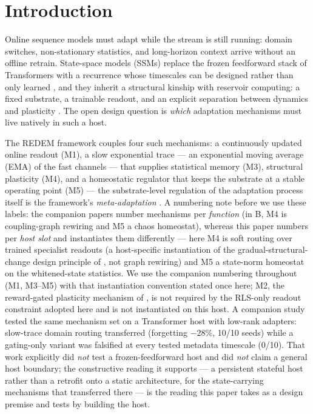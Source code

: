 \documentclass[preprint,12pt]{elsarticle}
\begin{document}
\section{Introduction}
\label{sec:intro}

Online sequence models must adapt while the stream is still running:
domain switches, non-stationary statistics, and long-horizon context
arrive without an offline retrain. State-space models (SSMs) replace
the frozen feedforward stack of Transformers with a recurrence whose
timescales can be designed rather than only learned
\cite{gu2022s4,gu2023mamba}, and they inherit a structural kinship
with reservoir computing: a fixed substrate, a trainable readout, and
an explicit separation between dynamics and plasticity
\cite{lukosevicius2009,jaeger2001esn}. The open design question is
\emph{which} adaptation mechanisms must live natively in such a host.

The REDEM framework couples four such mechanisms: a continuously
updated online readout (M1), a slow exponential trace --- an
exponential moving average (EMA) of the fast channels --- that
supplies statistical memory (M3), structural plasticity (M4), and a
homeostatic regulator that keeps the substrate at a stable operating
point (M5) --- the substrate-level regulation of the adaptation
process itself is the framework's \emph{meta-adaptation}
\cite{redemb}. A numbering note before we use these labels: the
companion papers number mechanisms per \emph{function} (in B, M4 is
coupling-graph rewiring and M5 a chaos homeostat), whereas this paper
numbers per \emph{host slot} and instantiates them differently --- here
M4 is soft routing over trained specialist readouts (a host-specific
instantiation of the gradual-structural-change design principle of
\cite{redemc}, not graph rewiring) and M5 a state-norm homeostat on
the whitened-state statistics. We use the companion numbering
throughout (M1, M3--M5) with that instantiation convention stated
once here; M2, the reward-gated plasticity mechanism of \cite{redemb},
is not
required by the RLS-only readout constraint adopted here and is not
instantiated on this host. A companion study \cite{redemc} tested the
same mechanism set on a Transformer host with low-rank adapters:
slow-trace domain
routing transferred (forgetting $-28\%$, 10/10 seeds) while a
gating-only variant was falsified at every tested metadata timescale
(0/10). That work explicitly did \emph{not} test a frozen-feedforward
host and did \emph{not} claim a general host boundary; the constructive
reading it supports --- a persistent stateful host rather than a
retrofit onto a static architecture, for the state-carrying mechanisms
that transferred there --- is the reading this paper takes as a design
premise and tests by building the host.
\end{document}
